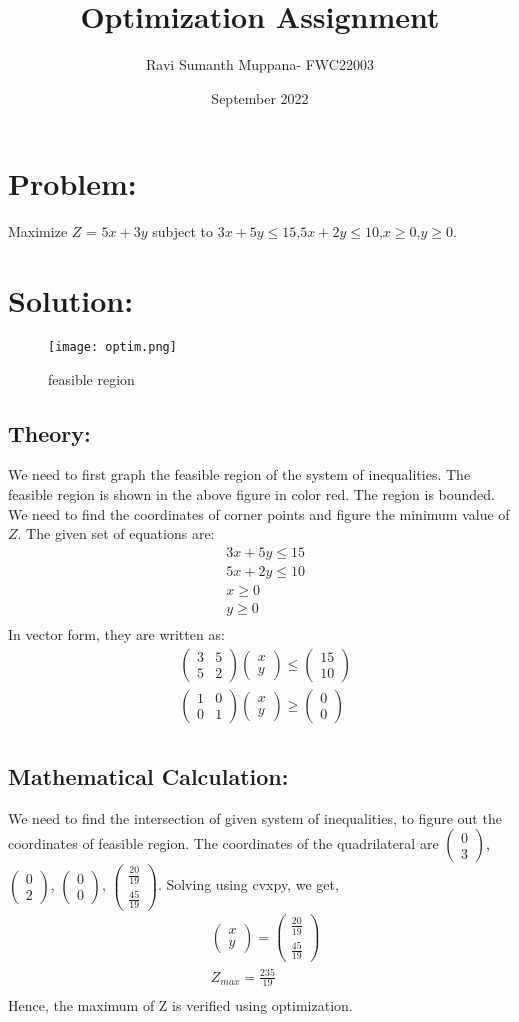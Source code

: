 \documentclass[a4paper,12pt,twocolumn]{article}
\title{Optimization Assignment}
\author{Ravi Sumanth Muppana- FWC22003}
\date{September 2022}
\newcommand{\myvec}[1]{\ensuremath{\begin{pmatrix}#1\end{pmatrix}}}
\begin{document}
\maketitle
\section{Problem:}
Maximize $Z$ = $5x+3y$ subject to $3x+5y\le15$,$5x+2y\le10$,$x\ge0$,$y\ge0$.
\maketitle
\section{Solution:}
\begin{figure}[h]
\texttt{[image: optim.png]}
        \caption{feasible region}
\end{figure}
\subsection{Theory:}
We need to first graph the feasible region of the system of inequalities. The feasible region is shown in the above figure in color red. The region is bounded. We need to find the coordinates of corner points and figure the minimum value of $Z$. The given set of equations are:
\begin{align}
	&3x+5y\le15\\
	&5x+2y\le10\\
	&x\ge0\\
	&y\ge0\\
\end{align}
In vector form, they are written as:
\begin{align}
	&\myvec{3 & 5\\5&2}\myvec{x\\y}\le\myvec{15\\10}\\
	&\myvec{1&0\\0&1}\myvec{x\\y}\ge\myvec{0\\0}\\
\end{align}
\subsection{Mathematical Calculation:}
We need to find the intersection of given system of inequalities, to figure out the coordinates of feasible region.
The coordinates of the quadrilateral are $\myvec{0\\3}$, $\myvec{0\\2}$, $\myvec{0\\0}$, $\myvec{\frac{20}{19} \\ \frac{45}{19}}$.
Solving using cvxpy, we get,
\begin{align}
	&\myvec{x\\y} = \myvec{\frac{20}{19}\\\frac{45}{19}}\\
	&Z_{max} = \frac{235}{19}\\
\end{align}
Hence, the maximum of Z is verified using optimization.
 
\end{document}
